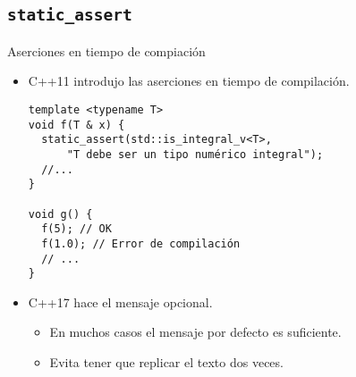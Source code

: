 \subsection{\bf{\texttt{static\_assert}}}

\begin{frame}[t,fragile]{Aserciones en tiempo de compiación}
\begin{itemize}
  \item C++11 introdujo las aserciones en tiempo de compilación.
\begin{lstlisting}
template <typename T>
void f(T & x) {
  static_assert(std::is_integral_v<T>, 
      "T debe ser un tipo numérico integral");
  //...
}

void g() {
  f(5); // OK
  f(1.0); // Error de compilación
  // ...
}
\end{lstlisting}

  \vfill\pause
  \item C++17 hace el mensaje opcional.
    \begin{itemize}
      \item En muchos casos el mensaje por defecto es suficiente.
      \item Evita tener que replicar el texto dos veces.
    \end{itemize}
\end{itemize}
\end{frame}
